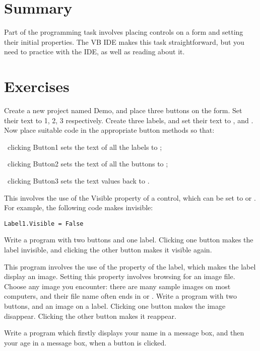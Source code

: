 	\section{Summary}
		Part of the programming task involves placing controls on a form and setting their initial properties. The VB IDE makes this task straightforward, but you need to practice with the IDE, as well as reading about it.

	\section{Exercises}
		\begin{enumChapter}
		\item Create a new project named Demo, and place three buttons on the form. Set their text to 1, 2, 3 respectively. Create three labels, and set their text to ,  and . 
				Now place suitable code in the appropriate button methods so that:
				\begin{enumAlph}
				\item clicking Button1 sets the text of all the labels to ;
				\item clicking Button2 sets the text of all the buttons to ;
				\item clicking Button3 sets the text values back to .
				\end{enumAlph}
			\item	This involves the use of the Visible property of a control, which can be set to  or . For example, the following code makes  invisible:
				\begin{lstlisting}
Label1.Visible = False
				\end{lstlisting}
				Write a program with two buttons and one label. Clicking one button makes the label invisible, and clicking the other button makes it visible again.
			\item	This program involves the use of the  property of the label, which makes the label display an image. Setting this property involves browsing for an image file. Choose any image you encounter: there are many sample images on most computers, and their file name often ends in  or . Write a program with two buttons, and an image on a label. Clicking one button makes the image disappear. Clicking the other button makes it reappear.
			\item	Write a program which firstly displays your name in a message box, and then your age in a message box, when a button is clicked.

\end{enumChapter}
